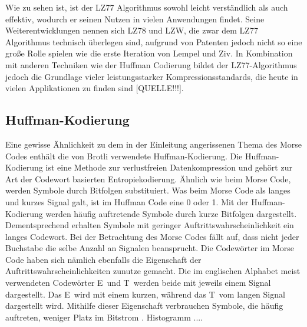Wie zu sehen ist, ist der LZ77 Algorithmus sowohl leicht verständlich als auch effektiv, wodurch er seinen Nutzen in vielen Anwendungen findet.
Seine Weiterentwicklungen nennen sich LZ78 und LZW, die zwar dem LZ77 Algorithmus technisch überlegen sind, aufgrund von Patenten jedoch nicht so eine große Rolle spielen wie die erste Iteration von Lempel und Ziv.
In Kombination mit anderen Techniken wie der Huffman Codierung bildet der LZ77-Algorithmus jedoch die Grundlage vieler leistungsstarker Kompressionsstandards, die heute in vielen Applikationen zu finden sind [QUELLE!!!]. \newline


\subsection{Huffman-Kodierung}
\label{subsec:huffman}
Eine gewisse Ähnlichkeit zu dem in der Einleitung angerissenen Thema des Morse Codes enthält die von Brotli verwendete Huffman-Kodierung.
Die Huffman-Kodierung ist eine Methode zur verlustfreien Datenkompression und gehört zur Art der Codewort basierten Entropiekodierung.
Ähnlich wie beim Morse Code, werden Symbole durch Bitfolgen substituiert.
Was beim Morse Code als langes und kurzes Signal galt, ist im Huffman Code eine 0 oder 1.
Mit der Huffman-Kodierung werden häufig auftretende Symbole durch kurze Bitfolgen dargestellt.
Dementsprechend erhalten Symbole mit geringer Auftrittswahrscheinlichkeit ein langes Codewort.
Bei der Betrachtung des Morse Codes fällt auf, dass nicht jeder Buchstabe die selbe Anzahl an Signalen beansprucht.
Die Codewörter im Morse Code haben sich nämlich ebenfalls die Eigenschaft der Auftrittswahrscheinlichkeiten zunutze gemacht.
Die im englischen Alphabet meist verwendeten Codewörter \glqq E\grqq\ und \glqq T\grqq\ werden beide mit jeweils einem Signal dargestellt.
Das \glqq E\grqq\ wird mit einem kurzen, während das \glqq T\grqq\ vom langen Signal dargestellt wird.
Mithilfe dieser Eigenschaft verbrauchen Symbole, die häufig auftreten, weniger Platz im Bitstrom \cite{Moffat2019}.
Histogramm ....

